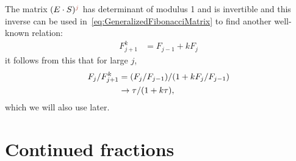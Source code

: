  The matrix $(E\cdot S)^\jqn{j}$ has determinant of modulus 1 and is invertible and this inverse can be used in~\eqref{eq:GeneralizedFibonacciMatrix} to find another well-known relation:
\begin{align}
	   F^k_{j+1} &=  F_{j-1} + k F_j
\end{align}
it follows from this that for large $j$, 
\begin{align}
	F_j/F^k_{j+1}&=(F_j/F_{j-1}) / (1+k F_j/F_{j-1})
	\\
	&\rightarrow \tau/(1+k\tau)
	,
\end{align} which we will also use later.

\section{Continued fractions}

